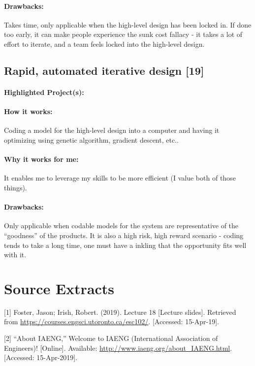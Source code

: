 \documentclass[a4paper,12pt]{article}
\begin{document}
\paragraph{Drawbacks: }
Takes time, only applicable when the high-level design has been locked in. If done too early, it can make people experience the sunk cost fallacy - it takes a lot of effort to iterate, and a team feels locked into the high-level design.

\subsection{Rapid, automated iterative design [19]}
\paragraph{Highlighted Project(s): }

\paragraph{How it works: }
Coding a model for the high-level design into a computer and having it optimizing using {genetic algorithm, gradient descent, etc.}.

\paragraph{Why it works for me: }
It enables me to leverage my skills to be more efficient (I value both of those things).

\paragraph{Drawbacks: }
Only applicable when codable models for the system are representative of the “goodness” of the products. It is also a high risk, high reward scenario - coding tends to take a long time, one must have a inkling that the opportunity fits well with it.







\section{Source Extracts}
[1] Foster, Jason; Irish, Robert. (2019). Lecture 18 [Lecture slides]. Retrieved from \url{https://courses.engsci.utoronto.ca/esc102/}. [Accessed: 15-Apr-19].

[2] “About IAENG,” Welcome to IAENG (International Association of Engineers)! [Online]. Available: \url{http://www.iaeng.org/about_IAENG.html}. [Accessed: 15-Apr-2019].
\end{document}
